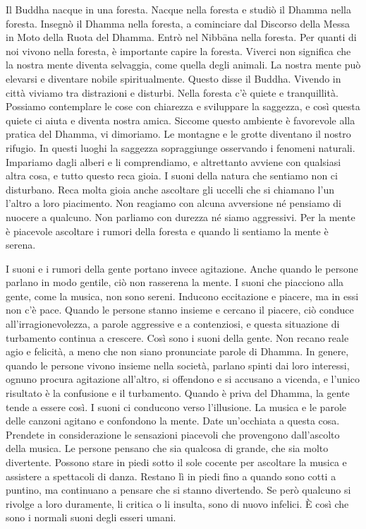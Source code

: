Il Buddha nacque in una foresta. Nacque nella foresta e studiò il Dhamma
nella foresta. Insegnò il Dhamma nella foresta, a cominciare dal
Discorso della Messa in Moto della Ruota del Dhamma. Entrò nel
Nibbāna nella foresta. Per quanti di noi vivono nella foresta, è
importante capire la foresta. Viverci non significa che la nostra mente
diventa selvaggia, come quella degli animali. La nostra mente può
elevarsi e diventare nobile spiritualmente. Questo disse il Buddha.
Vivendo in città viviamo tra distrazioni e disturbi. Nella foresta c'è
quiete e tranquillità. Possiamo contemplare le cose con chiarezza e
sviluppare la saggezza, e così questa quiete ci aiuta e diventa nostra
amica. Siccome questo ambiente è favorevole alla pratica del Dhamma, vi
dimoriamo. Le montagne e le grotte diventano il nostro rifugio. In
questi luoghi la saggezza sopraggiunge osservando i fenomeni naturali.
Impariamo dagli alberi e li comprendiamo, e altrettanto avviene con
qualsiasi altra cosa, e tutto questo reca gioia. I suoni della natura
che sentiamo non ci disturbano. Reca molta gioia anche ascoltare gli
uccelli che si chiamano l'un l'altro a loro piacimento. Non reagiamo con
alcuna avversione né pensiamo di nuocere a qualcuno. Non parliamo con
durezza né siamo aggressivi. Per la mente è piacevole ascoltare i rumori
della foresta e quando li sentiamo la mente è serena.

I suoni e i rumori della gente portano invece agitazione. Anche quando
le persone parlano in modo gentile, ciò non rasserena la mente. I suoni
che piacciono alla gente, come la musica, non sono sereni. Inducono
eccitazione e piacere, ma in essi non c'è pace. Quando le persone stanno
insieme e cercano il piacere, ciò conduce all'irragionevolezza, a
parole aggressive e a contenziosi, e questa situazione di turbamento
continua a crescere. Così sono i suoni della gente. Non recano reale
agio e felicità, a meno che non siano pronunciate parole di Dhamma. In
genere, quando le persone vivono insieme nella società, parlano spinti
dai loro interessi, ognuno procura agitazione all'altro, si offendono e
si accusano a vicenda, e l'unico risultato è la confusione e il
turbamento. Quando è priva del Dhamma, la gente tende a essere così. I
suoni ci conducono verso l'illusione. La musica e le parole delle
canzoni agitano e confondono la mente. Date un'occhiata a questa cosa.
Prendete in considerazione le sensazioni piacevoli che provengono
dall'ascolto della musica. Le persone pensano che sia qualcosa di
grande, che sia molto divertente. Possono stare in piedi sotto il sole
cocente per ascoltare la musica e assistere a spettacoli di danza.
Restano lì in piedi fino a quando sono cotti a puntino, ma continuano a
pensare che si stanno divertendo. Se però qualcuno si rivolge a loro
duramente, li critica o li insulta, sono di nuovo infelici. È così che
sono i normali suoni degli esseri umani.

